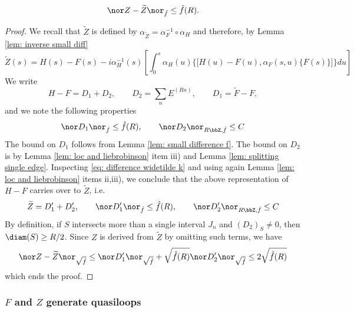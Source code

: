 \begin{lemma}\label{lem: small differences k}
	$$
	\nor Z-\widetilde Z\nor_{\hat{f}} \leq \hat{f}(R).
	$$
\end{lemma}
\begin{proof}
	We recall that $\widetilde Z$ is defined by  $\alpha_{\widetilde Z}=\alpha_{F}^{-1} \circ \alpha_H$ and therefore, by Lemma \ref{lem: inverse small diff}
	\begin{equation}\label{eq: difference widetilde k}
		\widetilde Z(s)=H(s)-F(s)- i \alpha^{-1}_{H}(s)\left[\int_0^s \alpha_{H}(u)\Big\{\big[H(u) - F(u),\alpha_F(s,u)\{F(s)\}\big]\Big\}du \right]
	\end{equation}
	We write
	$$H-F = D_1+D_2,\qquad  D_2=  \sum_n E^{(Rn)}, \qquad  D_1= \widetilde F - F, $$
	and we note the following properties
	$$
	\nor D_1\nor_{\hat{f}}\leq \hat{f}(R),\qquad   \nor D_2\nor_{R\bbZ,\hat{f}}\leq C
	$$ 
	The bound on $D_1$ follows from Lemma \ref{lem: small difference f}. The bound on $D_2$ is by Lemma \ref{lem: loc and liebrobinson} item iii) and Lemma \ref{lem: splitting single edge}.  
	Inspecting \eqref{eq: difference widetilde k} and using again Lemma \ref{lem: loc and liebrobinson} items ii,iii), we conclude that the above representation of $H-F$ carries over to $\widetilde Z$, i.e.\ 
	$$
	\widetilde Z = D_1'+D'_2,\qquad   \nor D_1'\nor_{\hat{f}} \leq   \hat{f}(R),\qquad  \nor D_2'\nor_{R\bbZ,\hat{f}} \leq   C
	$$
	By definition, if $S$ intersects more than a single interval $J_n$ and  $(D_2)_S \neq 0$, then $\diam(S) \geq R/2$.  Since $Z$ is derived from $\widetilde Z$ by omitting such terms, we have
	$$
	\nor Z-\widetilde Z \nor_{\sqrt{\hat{f}}} \leq  \nor D_1' \nor_{\sqrt{\hat{f}}}+ \sqrt{\hat{f}(R)} \nor D_2'\nor_{\sqrt{\hat{f}}}     \leq  2 \sqrt{\hat f(R)}
	$$  which ends the proof.
\end{proof}









\subsubsection{$F$ and $Z$ generate quasiloops}\label{sec: quasiloops}




